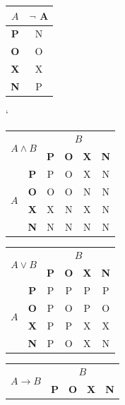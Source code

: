 \documentclass[11pt,a4paper]{article}
\begin{document}
\begin{table}[h]
\begin{center}
\begin{tabular}{|c|c|}
\hline
$A$ & $\neg$ A \\ \hline
\textbf{P} & N \\ \hline
\textbf{O} & O \\ \hline
\textbf{X} & X \\ \hline
\textbf{N} & P \\
\hline
\end{tabular}
\vspace{1mm}
\catcode`
\begin{tabular}{|c|c|c|c|c|c|}
\hline
\multicolumn{2}{|c}{\multirow{2}{*}{$A \wedge B$}} \vline & \multicolumn{4}{c}{$B$} \vline \\
\cline{3-6}
\multicolumn{2}{|c}{} \vline & \textbf{P} & \textbf{O} & \textbf{X} & \textbf{N} \\ \hline
\multirow{4}{*}{$A$} & \textbf{P} & P & O & X & N \\ \cline{2-6}
\multirow{4}{*}{} & \textbf{O} & O & O & N & N \\ \cline{2-6}
\multirow{4}{*}{} & \textbf{X} & X & N & X & N \\ \cline{2-6}
\multirow{4}{*}{} & \textbf{N} & N & N & N & N \\ \hline
\end{tabular}
\vspace{1mm}
\begin{tabular}{|c|c|c|c|c|c|}
\hline
\multicolumn{2}{|c}{\multirow{2}{*}{$A \vee B$}} \vline & \multicolumn{4}{c}{$B$} \vline \\
\cline{3-6}
\multicolumn{2}{|c}{} \vline & \textbf{P} & \textbf{O} & \textbf{X} & \textbf{N} \\ \hline
\multirow{4}{*}{$A$} & \textbf{P} & P & P & P & P \\ \cline{2-6}
\multirow{4}{*}{} & \textbf{O} & P & O & P & O \\ \cline{2-6}
\multirow{4}{*}{} & \textbf{X} & P & P & X & X \\ \cline{2-6}
\multirow{4}{*}{} & \textbf{N} & P & O & X & N \\ \hline
\end{tabular}
\vspace{1mm}
\begin{tabular}{|c|c|c|c|c|c|}
\hline
\multicolumn{2}{|c}{\multirow{2}{*}{$A \rightarrow B$}} \vline & \multicolumn{4}{c}{$B$} \vline \\
\cline{3-6}
\multicolumn{2}{|c}{} \vline & \textbf{P} & \textbf{O} & \textbf{X} & \textbf{N} \\ \hline

\end{tabular}
\end{center}
\end{table}
\end{document}
